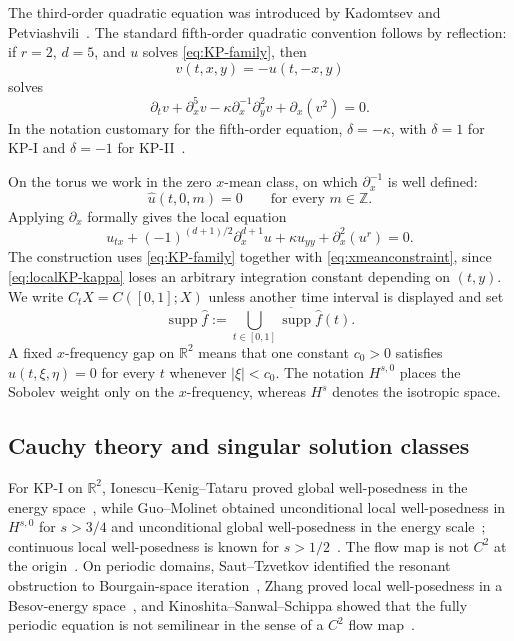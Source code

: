 \documentclass[12pt,reqno,letterpaper]{amsart}
\numberwithin{equation}{section}
\theoremstyle{definition}
\newcommand{\R}{\mathbb R}
\newcommand{\Z}{\mathbb Z}
\newcommand{\supp}{\operatorname{supp}}
\newcommand{\abs}[1]{\left\lvert #1\right\rvert}
\begin{document}
The third-order quadratic equation was introduced by Kadomtsev and
Petviashvili~\cite{KadomtsevPetviashvili}.  The standard
fifth-order quadratic convention follows by reflection: if $r=2$, $d=5$,
and $u$ solves \eqref{eq:KP-family}, then
\begin{equation}\label{eq:fifth-order-reflection}
 v(t,x,y)=-u(t,-x,y)
\end{equation}
solves
\begin{equation}\label{eq:fifth-order-divided}
 \partial_tv+\partial_x^5v
 -\kappa\partial_x^{-1}\partial_y^2v+\partial_x(v^2)=0.
\end{equation}
In the notation customary for the fifth-order equation,
$\delta=-\kappa$, with $\delta=1$ for KP-I and $\delta=-1$ for KP-II~\cite{SautTzvetkovFifth,Patterson5KP}.

On the torus we work in the zero $x$-mean class, on which
$\partial_x^{-1}$ is well defined:
\begin{equation}\label{eq:xmeanconstraint}
    \widehat u(t,0,m)=0
    \qquad\text{for every }m\in\Z.
\end{equation}
Applying $\partial_x$ formally gives the local equation
\begin{equation}\label{eq:localKP-kappa}
 u_{tx}+(-1)^{(d+1)/2}\partial_x^{d+1}u
 +\kappa u_{yy}+\partial_x^2(u^r)=0.
\end{equation}
The construction uses \eqref{eq:KP-family} together with
\eqref{eq:xmeanconstraint}, since \eqref{eq:localKP-kappa} loses an
arbitrary integration constant depending on $(t,y)$.
We write $C_tX=C([0,1];X)$ unless another time interval is displayed and set
\[
 \supp\widehat f
 :=\overline{\bigcup_{t\in[0,1]}\supp\widehat f(t)}.
\]
A fixed
$x$-frequency gap on $\R^2$ means that one constant $c_0>0$ satisfies
$\widehat u(t,\xi,\eta)=0$ for every $t$ whenever $\abs\xi<c_0$.
The notation $H^{s,0}$ places the Sobolev weight only on the
$x$-frequency, whereas $H^s$ denotes the isotropic space.

\subsection{Cauchy theory and singular solution classes}

For KP-I on $\R^2$, Ionescu--Kenig--Tataru proved global well-posedness in
the energy space~\cite{IKT}, while Guo--Molinet obtained unconditional
local well-posedness in $H^{s,0}$ for $s>3/4$ and unconditional global
well-posedness in the energy scale~\cite{GuoMolinet}; continuous local
well-posedness is known for $s>1/2$~\cite{Guo}.  The flow map is not $C^2$
at the origin~\cite{MolinetSautTzvetkovIllposed}.  On periodic domains,
Saut--Tzvetkov identified the resonant obstruction to Bourgain-space
iteration~\cite{SautTzvetkovPeriodic}, Zhang proved local well-posedness in
a Besov-energy space~\cite{Zhang}, and Kinoshita--Sanwal--Schippa showed
that the fully periodic equation is not semilinear in the sense of a $C^2$
flow map~\cite{KSS}.
\end{document}
